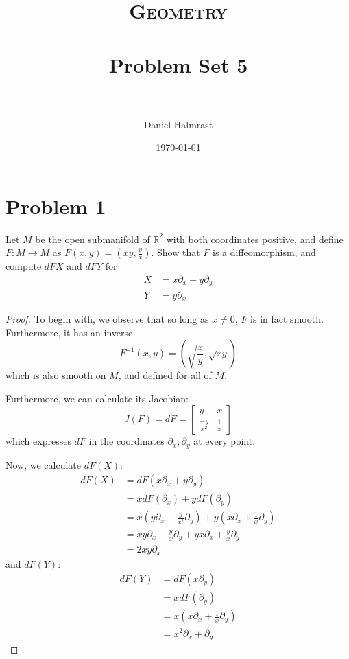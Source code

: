 \documentclass[fontsize=11pt]{scrartcl} %
\title{	
\normalfont \normalsize 
\textsc{Geometry} \\ [25pt] %
\horrule{0.5pt} \\[0.4cm] %
\huge Problem Set 5 \\ %
\horrule{2pt} \\[0.5cm] %
}
\author{Daniel Halmrast} %
\date{\normalsize\today} %
\numberwithin{equation}{section} %
\numberwithin{figure}{section} %
\numberwithin{table}{section} %
\newcommand{\R}{\mathbb{R}}
\begin{document}
\maketitle %


\section*{Problem 1} %
Let $M$ be the open submanifold of $\R^2$ with both coordinates positive, and
define $F:M\to M$ as $F(x,y) = (xy,\frac{y}{x})$. Show that $F$ is a
diffeomorphism, and compute $dFX$ and $dFY$ for
\[
    \begin{aligned}
        X &= x\partial_x + y\partial_y\\
        Y &= y\partial_x
    \end{aligned}
\]

\begin{proof}
    To begin with, we observe that so long as $x\neq 0$, $F$ is in fact smooth.
    Furthermore, it has an inverse
    \[
        F^{-1}(x,y) = (\sqrt{\frac{x}{y}},\sqrt{xy})
    \]
    which is also smooth on $M$, and defined for all of $M$.

    Furthermore, we can calculate its Jacobian:
    \[
        J(F) = dF =
        \begin{bmatrix}
            y & x\\
            \frac{-y}{x^2} & \frac{1}{x}
        \end{bmatrix}
    \]
    which expresses $dF$ in the coordinates $\partial_x,\partial_y$ at every
    point.

    Now, we calculate $dF(X)$:
    \[
        \begin{aligned}
            dF(X) &= dF(x\partial_x + y\partial_y)\\
                &= xdF(\partial_x) + ydF(\partial_y)\\
                &= x(y\partial_x - \frac{y}{x^2}\partial_y) + y(x\partial_x +
                \frac{1}{x}\partial_y)\\
                &= xy\partial_x - \frac{y}{x}\partial_y + yx\partial_x
                +\frac{y}{x}\partial_y\\
                &= 2xy\partial_x
        \end{aligned}
    \]
    and $dF(Y)$:
    \[
        \begin{aligned}
            dF(Y) &= dF(x\partial_y)\\
                  &= xdF(\partial_y)\\
                  &= x(x\partial_x + \frac{1}{x}\partial_y)\\
                  &=x^2\partial_x + \partial_y
        \end{aligned}
    \]
\end{proof}
\end{document}
